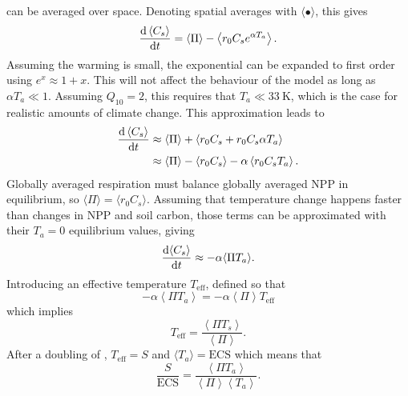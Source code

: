  can be averaged over space. Denoting spatial averages with $\langle \bullet \rangle$, this gives
\begin{equation}
  \label{eq:spatially_averaged_soil_carbon}
  \dv{\left\langle C_s\right\rangle}{t} = \left\langle \Pi \right \rangle - \left\langle r_0 C_s e^{\alpha T_a} \right \rangle.
\end{equation}
Assuming the warming is small, the exponential can be expanded to first order using $e^x \approx 1 + x$. This will not affect the behaviour of the model
as long as $\alpha T_a \ll 1$. Assuming $Q_{10} = 2$, this requires that $T_a \ll \SI{33}{\kelvin}$, which is the case for realistic amounts of climate change.
This approximation leads to
\begin{align*}
  \dv{\left\langle C_s\right\rangle}{t} &\approx \left\langle \Pi \right \rangle  + \left\langle r_0 C_s + r_0 C_s \alpha T_a \right \rangle \\
                                        &\approx \left\langle \Pi \right \rangle - \left\langle r_0 C_s\right \rangle - \alpha \left \langle r_0C_s T_a\right\rangle.
\end{align*}
Globally averaged respiration must balance globally averaged NPP in equilibrium, so $\langle \Pi \rangle = \langle r_0 C_s \rangle$. Assuming that
temperature change happens faster than changes in NPP and soil carbon, those terms can be approximated with their $T_a = 0$ equilibrium values, giving
\begin{equation}
  \label{eq:soil_carbon_linearised}
  \dv{\langle C_s\rangle}{t} \approx -\alpha \langle \Pi T_a \rangle.
\end{equation}
Introducing an effective temperature $T_{\mathrm{eff}}$, defined so that
\begin{equation}
  \label{eq:motivation_of_effective_temperature}
  - \alpha \left \langle \Pi T_a \right\rangle = - \alpha \left \langle \Pi \right\rangle T_{\mathrm{eff}}
\end{equation}
which implies
\begin{equation}
  \label{eq:definition_of_effective_temperature}
  T_{\mathrm{eff}} = \frac{\left \langle \Pi T_s \right\rangle}{\left \langle \Pi \right\rangle}.
\end{equation}
After a doubling of , $T_{\mathrm{eff}} = S$ and $\langle T_a \rangle = \mathrm{ECS}$ which means that
\begin{equation}
  \label{eq:S_vs_ECS}
  \frac{S}{\mathrm{ECS}} = \frac{\left \langle \Pi T_a \right\rangle}{\left \langle \Pi \right\rangle \left \langle T_a \right \rangle}.
\end{equation}
